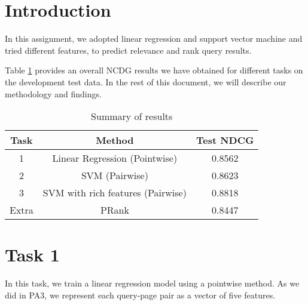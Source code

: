 
\usepackage{graphicx,amssymb,amsmath,enumerate}
\usepackage{courier}
\usepackage{color}
\usepackage{listings}
\usepackage{fancyvrb}
\usepackage{stmaryrd}

\oddsidemargin 0in
\evensidemargin 0in
\textwidth 6.5in
\topmargin -0.5in
\textheight 9.0in




\pagestyle{myheadings}  %

\section*{Introduction}
In this assignment, we adopted linear regression and support vector machine and tried different features, to predict relevance and rank query results.

Table \ref{tab:all} provides an overall NCDG results we have obtained for different tasks on the development test data.
In the rest of this document, we will describe our methodology and findings.
\begin{table}[h!]
\begin{center}
\begin{tabular}{|c|c|c|}
  \hline
  Task & Method & Test NDCG \\\hline
  1 &  Linear Regression (Pointwise) & 0.8562 \\\hline
  2 & SVM (Pairwise)  & 0.8623 \\\hline
  3 & SVM with rich features (Pairwise)  & 0.8818 \\ \hline
  Extra & PRank & 0.8447 \\\hline
\end{tabular}
\caption{Summary of results}\label{tab:all}
\end{center}
\end{table}

\section*{Task 1}
In this task, we train a linear regression model using a pointwise method.
As we did in PA3, we represent each query-page pair as a vector of five features.


